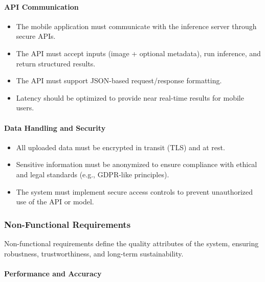 \documentclass[
  12pt,
  oneside]{article}
\providecommand{\tightlist}{%
  \setlength{\itemsep}{0pt}\setlength{\parskip}{0pt}}
\begin{document}
\paragraph{API Communication}\label{api-communication}

\begin{itemize}
\tightlist
\item
  The mobile application must communicate with the inference server
  through secure APIs.\\
\item
  The API must accept inputs (image + optional metadata), run inference,
  and return structured results.\\
\item
  The API must support JSON-based request/response formatting.\\
\item
  Latency should be optimized to provide near real-time results for
  mobile users.
\end{itemize}

\paragraph{Data Handling and Security}\label{data-handling-and-security}

\begin{itemize}
\tightlist
\item
  All uploaded data must be encrypted in transit (TLS) and at rest.\\
\item
  Sensitive information must be anonymized to ensure compliance with
  ethical and legal standards (e.g., GDPR-like principles).\\
\item
  The system must implement secure access controls to prevent
  unauthorized use of the API or model.
\end{itemize}

\subsubsection{Non-Functional
Requirements}\label{non-functional-requirements}

Non-functional requirements define the quality attributes of the system,
ensuring robustness, trustworthiness, and long-term sustainability.

\paragraph{Performance and Accuracy}\label{performance-and-accuracy}
\end{document}
